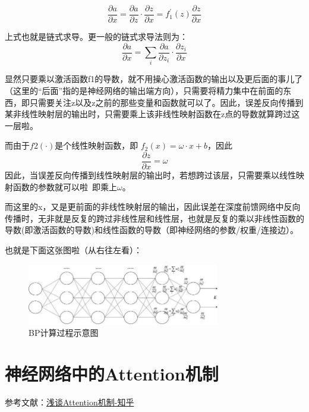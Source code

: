 \begin{displaymath}
\frac{\partial a}{\partial x} = \frac{\partial a}{\partial z}\cdot \frac{\partial z}{\partial x} = f_1^{'}(z)\frac{\partial z}{\partial x}
\end{displaymath}

上式也就是链式求导。更一般的链式求导法则为：
\begin{displaymath}
\frac{\partial a}{\partial x} = \sum_{i} \frac{\partial a}{\partial z_i}\cdot \frac{\partial z_i}{\partial x}
\end{displaymath}

显然只要乘以激活函数f1的导数，就不用操心激活函数的输出以及更后面的事儿了（这里的“后面”指的是神经网络的输出端方向），只需要将精力集中在前面的东西，即只需要关注z以及z之前的那些变量和函数就可以了。因此，误差反向传播到某非线性映射层的输出时，只需要乘上该非线性映射函数在z点的导数就算跨过这一层啦。

而由于$f2(\cdot)$是个线性映射函数，即 $f_2(x)=\omega \cdot x + b$，因此
\begin{displaymath}
\frac{\partial z}{\partial x} = \omega
\end{displaymath}
因此，当误差反向传播到线性映射层的输出时，若想跨过该层，只需要乘以线性映射函数的参数就可以啦~即乘上$\omega$。

而这里的x，又是更前面的非线性映射层的输出，因此误差在深度前馈网络中反向传播时，无非就是反复的跨过非线性层和线性层，也就是反复的乘以非线性函数的导数(即激活函数的导数)和线性函数的导数（即神经网络的参数/权重/连接边）。

也就是下面这张图啦（从右往左看）：

\begin{figure}[!bthp]
\centering
\includegraphics[width=0.75\textwidth]{DLTips/BP0.jpg}
\caption{BP计算过程示意图}
\label{BP0}
\end{figure}

\section{神经网络中的Attention机制}

参考文献：\href{https://zhuanlan.zhihu.com/p/35571412}{浅谈Attention机制-知乎}

